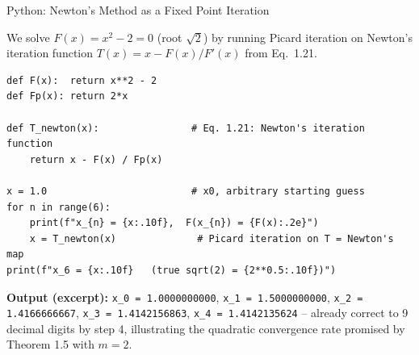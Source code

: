 \documentclass[aspectratio=169,10pt]{beamer}
\begin{document}
\begin{frame}[fragile]{Python: Newton's Method as a Fixed Point Iteration}

We solve $F(x)=x^2-2=0$ (root $\sqrt2$) by running Picard iteration on
Newton's iteration function $T(x)=x-F(x)/F'(x)$ from Eq.\ 1.21.

\begin{lstlisting}
def F(x):  return x**2 - 2
def Fp(x): return 2*x

def T_newton(x):                # Eq. 1.21: Newton's iteration function
    return x - F(x) / Fp(x)

x = 1.0                         # x0, arbitrary starting guess
for n in range(6):
    print(f"x_{n} = {x:.10f},  F(x_{n}) = {F(x):.2e}")
    x = T_newton(x)              # Picard iteration on T = Newton's map
print(f"x_6 = {x:.10f}   (true sqrt(2) = {2**0.5:.10f})")
\end{lstlisting}

\medskip
\textbf{Output (excerpt):} \texttt{x\_0 = 1.0000000000}, \texttt{x\_1 =
1.5000000000}, \texttt{x\_2 = 1.4166666667}, \texttt{x\_3 =
1.4142156863}, \texttt{x\_4 = 1.4142135624} -- already correct to 9
decimal digits by step 4, illustrating the quadratic convergence rate
promised by Theorem 1.5 with $m=2$.

\end{frame}
\end{document}
